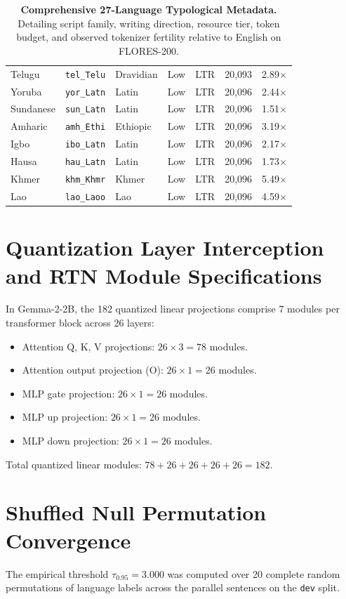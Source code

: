 \documentclass[11pt]{article}
\begin{document}
\begin{table}[t]
\begin{tabularx}{\textwidth}{llllcrr}
Telugu & \texttt{tel\_Telu} & Dravidian & Low & LTR & 20,093 & 2.89$\times$ \\
Yoruba & \texttt{yor\_Latn} & Latin & Low & LTR & 20,096 & 2.44$\times$ \\
Sundanese & \texttt{sun\_Latn} & Latin & Low & LTR & 20,096 & 1.51$\times$ \\
Amharic & \texttt{amh\_Ethi} & Ethiopic & Low & LTR & 20,096 & 3.19$\times$ \\
Igbo & \texttt{ibo\_Latn} & Latin & Low & LTR & 20,096 & 2.17$\times$ \\
Hausa & \texttt{hau\_Latn} & Latin & Low & LTR & 20,096 & 1.73$\times$ \\
Khmer & \texttt{khm\_Khmr} & Khmer & Low & LTR & 20,096 & 5.49$\times$ \\
Lao & \texttt{lao\_Laoo} & Lao & Low & LTR & 20,096 & 4.59$\times$ \\
\bottomrule
\end{tabularx}
\caption{\textbf{Comprehensive 27-Language Typological Metadata.} Detailing script family, writing direction, resource tier, token budget, and observed tokenizer fertility relative to English on FLORES-200.}
\label{tab:full_panel_metadata}
\end{table}

\section{Quantization Layer Interception and RTN Module Specifications}
\label{sec:appendix_rtn}
In Gemma-2-2B, the 182 quantized linear projections comprise 7 modules per transformer block across 26 layers:
\begin{itemize}
    \item Attention Q, K, V projections: $26 \times 3 = 78$ modules.
    \item Attention output projection (O): $26 \times 1 = 26$ modules.
    \item MLP gate projection: $26 \times 1 = 26$ modules.
    \item MLP up projection: $26 \times 1 = 26$ modules.
    \item MLP down projection: $26 \times 1 = 26$ modules.
\end{itemize}
Total quantized linear modules: $78 + 26 + 26 + 26 + 26 = 182$.

\section{Shuffled Null Permutation Convergence}
\label{sec:appendix_null}
The empirical threshold $\tau_{0.95} = 3.000$ was computed over 20 complete random permutations of language labels across the parallel sentences on the \texttt{dev} split.
\end{document}
